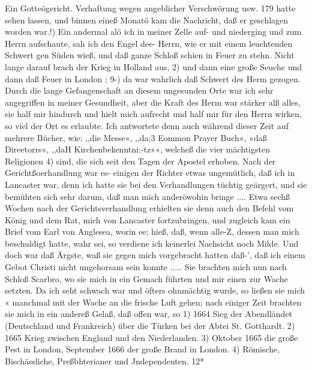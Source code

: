 Ein Gotteögericht. Verhaftung wegen angeblicher Verschwörung usw. 179
hatte sehen lassen, und binnen eineß Monatö kam die Nachricht,
daß er geschlagen worden war.!)
Ein andermal alö ich in meiner Zelle auf- und niederging
und zum Herrn aufschaute, sah ich den Engel dee- Herrn, wie er
mit einem leuchtenden Schwert gen Süden wieß, und daß ganze
Schloß schien in Feuer zu stehn. Nicht lange darauf brach der
Krieg in Holland aus, 2) und dann eine große Seuche und dann daß
Feuer in London ; 9-) da war wahrlich daß Schwert des Herm gezogen.
Durch die lange Gefangenschaft an diesem ungesunden Orte
war ich sehr angegriffen in meiner Gesundheit, aber die Kraft
des Herm war stärker alß alles, sie half mir hindurch und hielt
mich aufrecht und half mir für den Herrn wirken, so viel der
Ort es erlaubte. Ich antwortete denn auch während dieser Zeit
auf mehrere Bücher, wie: ,,die Messe«, ,,da;3 Eommon Prayer
Buch«, »daß Direetorrs«, ,,daH Kirchenbekenntni:-tz««, welcheß die
vier mächtigsten Religionen 4) sind, die sich seit den Tagen der
Apostel erhoben.
Nach der Gerichtßoerhandlung war es- einigen der Richter
etwas ungemütlich, daß ich in Lancaster war, denn ich hatte sie
bei den Verhandlungen tüchtig geärgert, und sie bemühten sich
sehr darum, daß man mich anderöwohin bringe .... Etwa sechß
Wochen nach der Gerichtsverhandlung erhielten sie denn auch den
Befehl vom König und dem Rat, mich von Lancaster fortzubringen,
und zugleich kam ein Brief vom Earl von Anglesea, worin ee;
hieß, daß, wenn alle-Z, dessen man mich beschuldigt hatte, wahr
sei, so verdiene ich keinerlei Nachsicht noch Milde. Und doch war
daß Ärgste, waß sie gegen mich vorgebracht hatten daß-’, daß ich
einem Gebot Christi nicht ungehorsam sein konnte .....
Sie brachten mich nun nach Schloß Scarbro, wo sie mich in
ein Gemach führten und mir einen zur Wache setzten. Da ich seht
schwach war und öfters ohnmächtig wurde, so ließen sie mich
« manchmal mit der Wache an die frische Luft gehen; nach einiger
Zeit brachten sie mich in ein andereß Gelaß, daß offen war, so
1) 1664 Sieg der Abendländet (Deutschland und Frankreich) über die
Türken bei der Abtei St. Gotthardt.
2) 1665 Krieg zwischen England und den Niederlanden.
3) Oktober 1665 die große Pest in London, September 1666 der große
Brand in London.
4) Römische, Bischässliche, Preßbhterianer und Jndependenten.
12*

